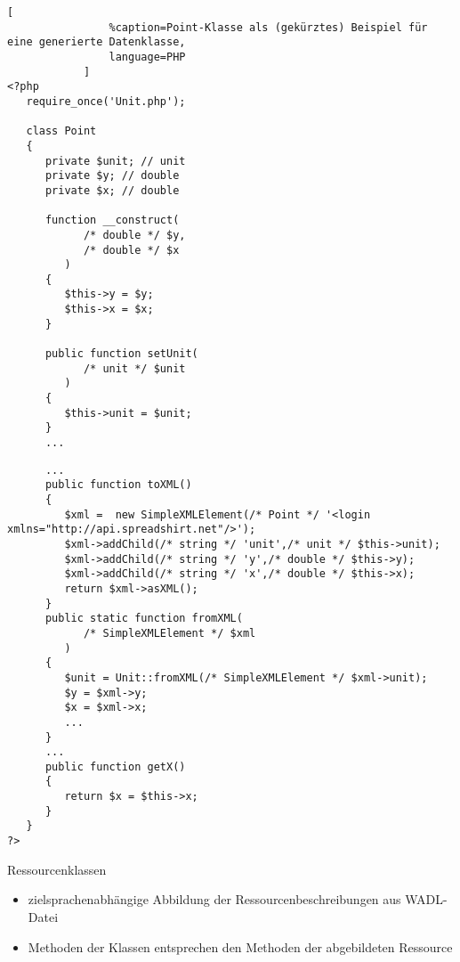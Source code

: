 \begin{frame}
    \begin{lstlisting}[
                %caption=Point-Klasse als (gekürztes) Beispiel für eine generierte Datenklasse,
                language=PHP
            ]
<?php
   require_once('Unit.php');

   class Point
   {
      private $unit; // unit 
      private $y; // double 
      private $x; // double 

      function __construct(
            /* double */ $y,
            /* double */ $x
         )
      {
         $this->y = $y;
         $this->x = $x;
      }

      public function setUnit(
            /* unit */ $unit
         )
      {
         $this->unit = $unit;
      }
      ...
    \end{lstlisting}
\end{frame}
\begin{frame}
    \begin{lstlisting}
      ...
      public function toXML()
      {
         $xml =  new SimpleXMLElement(/* Point */ '<login xmlns="http://api.spreadshirt.net"/>');
         $xml->addChild(/* string */ 'unit',/* unit */ $this->unit);
         $xml->addChild(/* string */ 'y',/* double */ $this->y);
         $xml->addChild(/* string */ 'x',/* double */ $this->x);
         return $xml->asXML();
      }
      public static function fromXML(
            /* SimpleXMLElement */ $xml
         )
      {
         $unit = Unit::fromXML(/* SimpleXMLElement */ $xml->unit);
         $y = $xml->y;
         $x = $xml->x;
         ...
      }
      ...
      public function getX()
      {
         return $x = $this->x;
      }
   }
?>
    \end{lstlisting}
\end{frame}

\begin{frame}{Ressourcenklassen}
    \begin{itemize}
        \item zielsprachenabhängige Abbildung der Ressourcenbeschreibungen aus WADL-Datei
        \item Methoden der Klassen entsprechen den Methoden der abgebildeten Ressource
    \end{itemize}
\end{frame}

